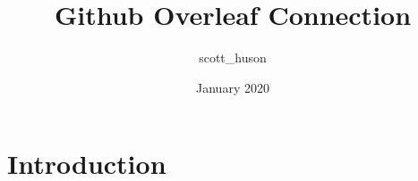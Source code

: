 \documentclass{article}
\title{Github Overleaf Connection}
\author{scott_huson }
\date{January 2020}
\begin{document}
\maketitle

\section{Introduction}
\end{document}
